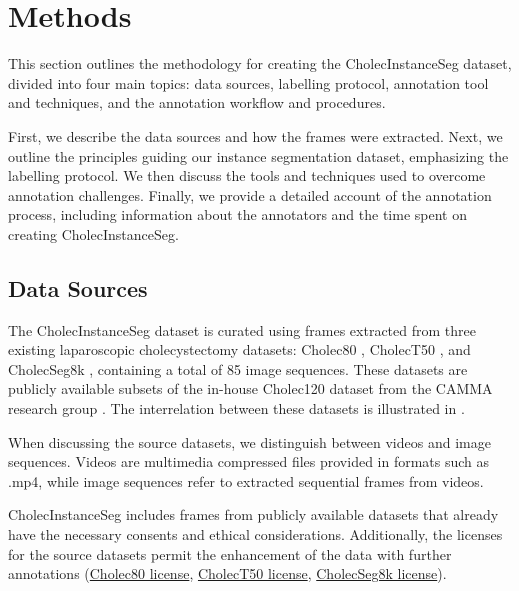 \section{Methods}
This section outlines the methodology for creating the CholecInstanceSeg dataset, divided into four main topics: data sources, labelling protocol, annotation tool and techniques, and the annotation workflow and procedures.

First, we describe the data sources and how the frames were extracted. Next, we outline the principles guiding our instance segmentation dataset, emphasizing the labelling protocol. We then discuss the tools and techniques used to overcome annotation challenges. Finally, we provide a detailed account of the annotation process, including information about the annotators and the time spent on creating CholecInstanceSeg.

\subsection{Data Sources}
The CholecInstanceSeg dataset is curated using frames extracted from three existing laparoscopic cholecystectomy datasets: Cholec80 \cite{EndoNet}, CholecT50 \cite{NWOYE2022102433_rendevous}, and CholecSeg8k \cite{cholecseg8k}, containing a total of 85 image sequences. 
These datasets are publicly available subsets of the in-house Cholec120 dataset \cite{twinanda2018rsdnet} from the CAMMA research group  
. The interrelation between these datasets is illustrated in  . 

When discussing the source datasets, we distinguish between videos and image sequences. Videos are multimedia compressed files provided in formats such as .mp4, while image sequences refer to extracted sequential frames from videos. 


CholecInstanceSeg includes frames from publicly available datasets that already have the necessary consents and ethical considerations. Additionally, the licenses for the source datasets permit the enhancement of the data with further annotations (\href{https://github.com/CAMMA-public/TF-Cholec80}{Cholec80 license}, \href{https://github.com/CAMMA-public/cholect50}{CholecT50 license}, \href{https://www.kaggle.com/datasets/newslab/cholecseg8k}{CholecSeg8k license}).

